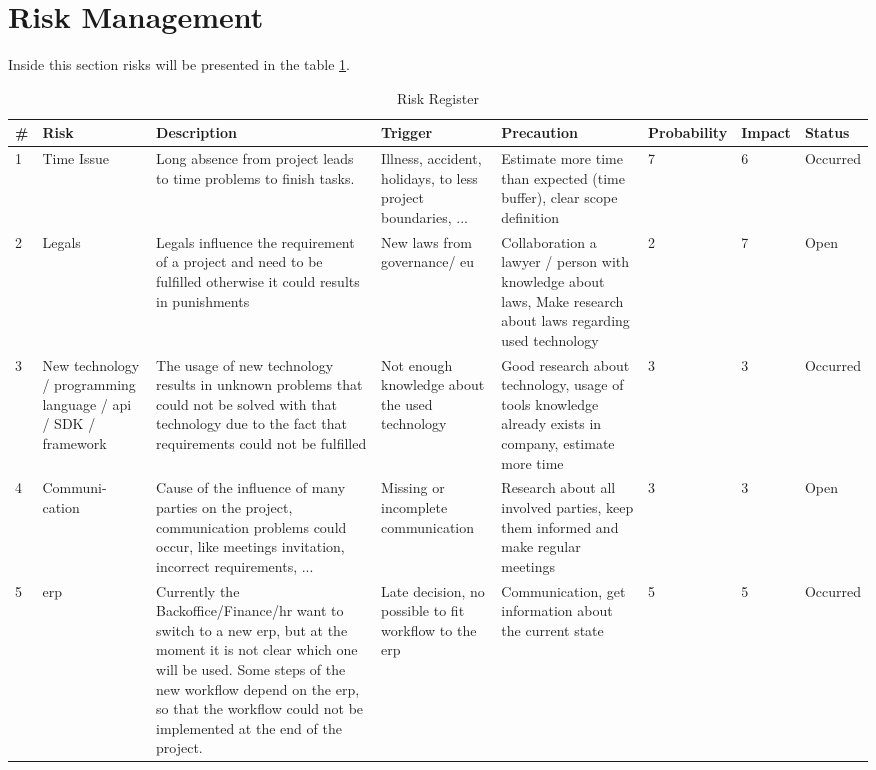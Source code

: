 \section{Risk Management}
Inside this section risks will be presented in the table \ref{fig:risks}.
\begin{center}
	\begin{landscape}
		\begin{table}[h]
			\begin{tabular}{|p{}|p{2cm}|p{4cm}|p{4cm}|p{4cm}|p{1,5cm}|p{}|p{}|} \hline
				\rowcolor{Gray} \# & Risk & Description & Trigger & Precaution & Probability & Impact & Status \\ \hline
				1 & Time Issue & Long absence from project leads to time problems to finish tasks. & Illness, accident, holidays, to less project boundaries, ... & Estimate more time than expected (time buffer), clear scope definition & 7 & 6 & Occurred \\ \hline
				2 & Legals & Legals influence the requirement of a project and need to be fulfilled otherwise it could results in punishments & New laws from governance/ \gls{eu} & Collaboration a lawyer / person with knowledge about laws, Make research about laws regarding used technology & 2 & 7 & Open \\ \hline
				3 & New technology / programming language / \gls{api} / \gls{SDK} / framework & The usage of new technology results	in unknown problems that could not be solved with that technology due to the fact that requirements could not be fulfilled & Not enough knowledge about 	the used technology & Good research about technology, usage of tools knowledge already exists in company, estimate more time & 3 & 3 & Occurred \\ \hline
				4 & Communi- cation & Cause of the influence of many parties on the project, communication problems could occur, like meetings invitation, incorrect requirements, ... & Missing or incomplete communication & Research about all involved parties, keep them informed and make regular meetings & 3 & 3 & Open \\ \hline
				5 & \gls{erp} & Currently the Backoffice/Finance/\gls{hr} want to switch to a new \gls{erp},
				but at the moment it is not clear which	one will be used. Some steps of	the new workflow depend on the \gls{erp}, so that the workflow could not be implemented at the end	of the project. & Late decision, no possible to fit workflow to the \gls{erp} & Communication, get information about the current state & 5 & 5 & Occurred \\ \hline
			\end{tabular}
			\caption{Risk Register}
			\label{fig:risks}
		\end{table}
	\end{landscape}
\end{center}
